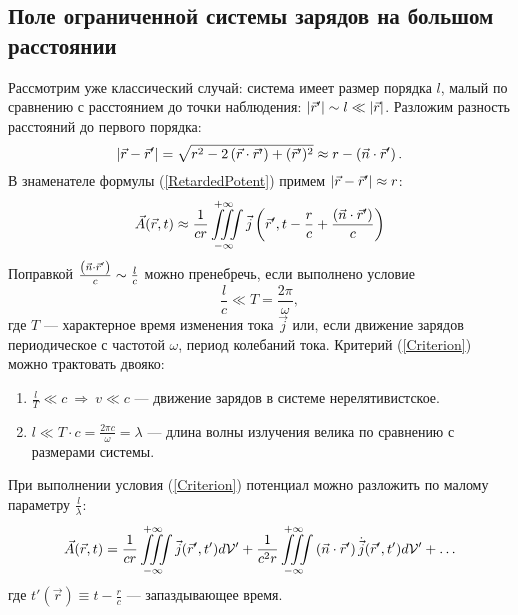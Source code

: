 \subsection{Поле ограниченной системы зарядов на большом расстоянии}
    Рассмотрим уже классический случай: система имеет размер порядка $l$, малый по сравнению с расстоянием до точки наблюдения:
    $\left|{\vec{r}'}\right| \sim l \ll \left|{\vec{r}}\right|$. Разложим разность расстояний до первого порядка:
    \[
        \left|{\vec{r} - \vec{r}'}\right| = \sqrt{r^2 - 2\left({\vec{r}\cdot\vec{r}'}\right) + (\vec{r}')^2}
        \approx r - \left({\vec{n}\cdot\vec{r}'}\right).
    \]
    В знаменателе формулы (\ref{RetardedPotent}) примем $\left|{\vec{r} - \vec{r}'}\right| \approx r$:
    \begin{equation}
        \vec{A}(\vec{r}, t) \approx \frac{1}{cr}\iiint\limits_{-\infty}^{+\infty}
        \vec{j}\left({\vec{r}', t - \frac rc + \frac{\left({\vec{n}\cdot\vec{r}'}\right)}{c}}\right) \label{ApproxPotent}
    \end{equation}
    Поправкой $\frac{\left({\vec{n}\cdot\vec{r}'}\right)}{c} \sim \frac lc$ можно пренебречь, если выполнено условие
    \begin{equation}
        \frac lc \ll T = \frac{2\pi}{\omega}, \label{Criterion}
    \end{equation}
    где $T$ --- характерное время изменения тока $\vec{j}$ или, если движение зарядов периодическое с частотой $\omega$, период колебаний тока.
    Критерий (\ref{Criterion}) можно трактовать двояко:
    \begin{enumerate}
        \item $\frac lT \ll c \: \Rightarrow \: v \ll c$ --- движение зарядов в системе нерелятивистское.
        \item $l \ll T\cdot c = \frac{2\pi c}{\omega} = \lambda$ --- длина волны излучения велика по сравнению с размерами системы.
    \end{enumerate}
    При выполнении условия (\ref{Criterion}) потенциал можно разложить по малому параметру $\frac l{\lambda}$:
    \[
        \vec{A}(\vec{r}, t) = \frac{1}{cr} \iiint\limits_{-\infty}^{+\infty} \vec{j}(\vec{r}', t') d\mathcal{V}' + 
        \frac{1}{c^2r} \iiint\limits_{-\infty}^{+\infty} \left({\vec{n}\cdot\vec{r}'}\right)\dot{\vec{j}}(\vec{r}', t')d\mathcal{V}' + \ldots
    \]
    где $t'(\vec{r}) \equiv t - \frac{r}{c}$ --- запаздывающее время.

